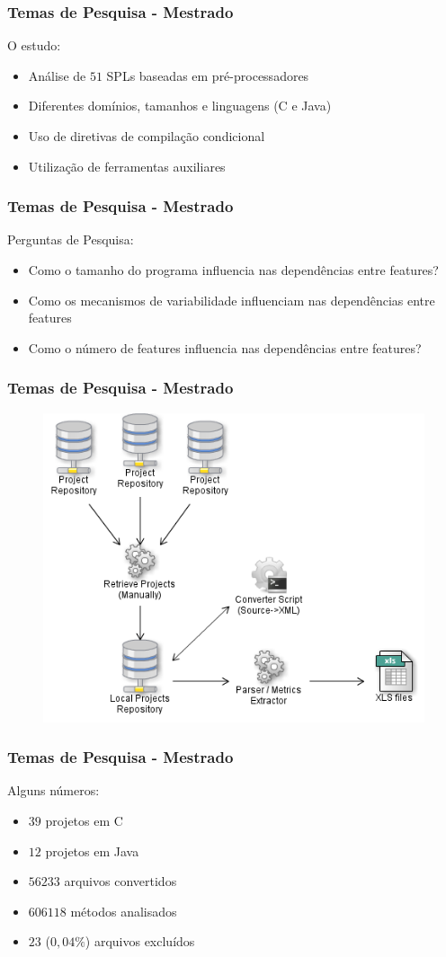 \begin{frame}
	\frametitle{Temas de Pesquisa - Mestrado}
	O estudo:
	\begin{itemize}
		\item Análise de $51$ SPLs baseadas em pré-processadores
		\item Diferentes domínios, tamanhos e linguagens (C e Java)
		\item Uso de diretivas de compilação condicional
		\item Utilização de ferramentas auxiliares
	\end{itemize}
\end{frame}

\begin{frame}
\frametitle{Temas de Pesquisa - Mestrado}
	Perguntas de Pesquisa:
	\begin{itemize}
		\item Como o tamanho do programa influencia nas dependências entre features?
		\item Como os mecanismos de variabilidade influenciam nas dependências entre features
		\item Como o número de features influencia nas dependências entre features?
	\end{itemize}
\end{frame}

\begin{frame}
	\frametitle{Temas de Pesquisa - Mestrado}
	\begin{center}
		\begin{figure}
			\includegraphics[width=.7\linewidth]{images/infrastructure}
		\end{figure}
	\end{center}
\end{frame}

\begin{frame}
	\frametitle{Temas de Pesquisa - Mestrado}
	Alguns números:
	\begin{itemize}
		\item $39$ projetos em C
		\item $12$ projetos em Java
		\item $56233$ arquivos convertidos
		\item $606118$ métodos analisados
		\item $23$ ($0,04\%$) arquivos excluídos
	\end{itemize}
\end{frame}

